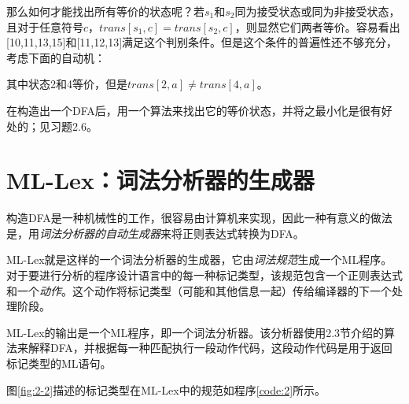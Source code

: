 \documentclass[cn,11pt,chinese]{elegantbook}
\begin{document}
那么如何才能找出所有等价的状态呢？若$s_1$和$s_2$同为接受状态或同为非接受状态，且对于任意符号$c$，$trans[s_1,c]=trans[s_2,c]$，则显然它们两者等价。容易看出[10,11,13,15]和[11,12,13]满足这个判别条件。但是这个条件的普遍性还不够充分，考虑下面的自动机：

\begin{figure}[htbp]
  \centering
\end{figure}

其中状态2和4等价，但是$trans[2,a] \neq trans[4,a]$。

在构造出一个DFA后，用一个算法来找出它的等价状态，并将之最小化是很有好处的；见习题2.6。

\section{ML-Lex：词法分析器的生成器}

构造DFA是一种机械性的工作，很容易由计算机来实现，因此一种有意义的做法是，用\textit{词法分析器的自动生成器}来将正则表达式转换为DFA。

ML-Lex就是这样的一个词法分析器的生成器，它由\textit{词法规范}生成一个ML程序。对于要进行分析的程序设计语言中的每一种标记类型，该规范包含一个正则表达式和一个\textit{动作}。这个动作将标记类型（可能和其他信息一起）传给编译器的下一个处理阶段。

ML-Lex的输出是一个ML程序，即一个词法分析器。该分析器使用2.3节介绍的算法来解释DFA，并根据每一种匹配执行一段动作代码，这段动作代码是用于返回标记类型的ML语句。

图\ref{fig:2-2}描述的标记类型在ML-Lex中的规范如程序\ref{code:2}所示。
\end{document}
